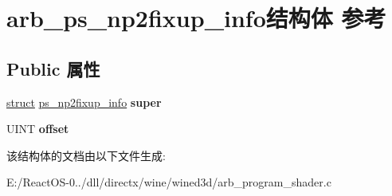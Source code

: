 \hypertarget{structarb__ps__np2fixup__info}{}\section{arb\+\_\+ps\+\_\+np2fixup\+\_\+info结构体 参考}
\label{structarb__ps__np2fixup__info}
\subsection*{Public 属性}
\begin{DoxyCompactItemize}
\item 
\mbox{\label{structarb__ps__np2fixup__info_aa7583fa1023dddd38bc072fe5c9e70be}} 
\hyperlink{interfacestruct}{struct} \hyperlink{structps__np2fixup__info}{ps\+\_\+np2fixup\+\_\+info} {\bfseries super}
\item 
\mbox{\label{structarb__ps__np2fixup__info_a1bc9b42734238fa26252549103ffcee1}} 
U\+I\+NT {\bfseries offset}
\end{DoxyCompactItemize}


该结构体的文档由以下文件生成\+:\begin{DoxyCompactItemize}
\item 
E\+:/\+React\+O\+S-\/0../dll/directx/wine/wined3d/arb\+\_\+program\+\_\+shader.\+c\end{DoxyCompactItemize}
